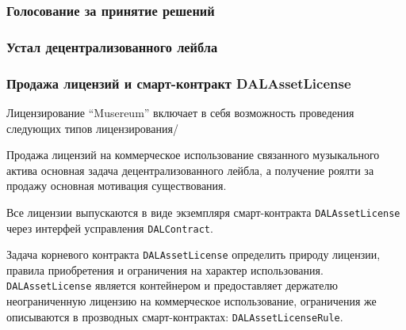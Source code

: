 \documentclass[12pt]{report}
\def\code#1{\colorbox{light-gray}{\texttt{#1}}}
\begin{document}
\subsubsection{Голосование за принятие решений}
\label{tech-apps-dal-voting}
\subsubsection{Устал децентрализованного лейбла}
\label{tech-apps-dal-charter}
\subsubsection{Продажа лицензий и смарт-контракт DALAssetLicense}
\label{tech-apps-dal-license}
\begin{multicols}{2}

Лицензирование “Musereum” включает в себя возможность проведения следующих типов лицензирования/

Продажа лицензий на коммерческое использование связанного музыкального актива основная задача децентрализованного лейбла, а получение роялти за продажу основная мотивация существования.

Все лицензии выпускаются в виде экземпляря смарт-контракта \code{DALAssetLicense} через интерфей усправления \code{DALContract}. 

Задача корневого контракта \code{DALAssetLicense} определить природу лицензии, правила приобретения и ограничения на характер использования. \code{DALAssetLicense} является контейнером и предоставляет держателю неограниченную лицензию на коммерческое использование, ограничения же описываются в прозводных смарт-контрактах: \code{DALAssetLicenseRule}.

\end{multicols}
\end{document}
